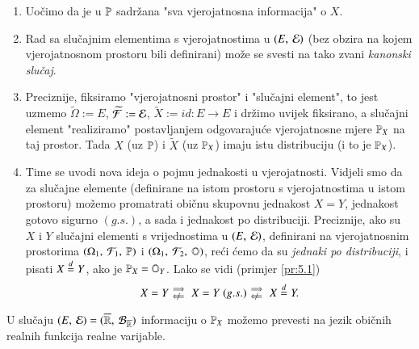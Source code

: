 \begin{nap} \label{nap:5.3}
    \quad
    \begin{enumerate}[label=(\alph*)]
        \item Uo\v cimo da je u $\mathbb{P}$ sadr\v zana "sva vjerojatnosna informacija" o $X$.
        \item Rad sa slu\v cajnim elementima s vjerojatnostima u $({E}, \: {\mathcal{E}})$ (bez obzira na kojem vjerojatnosnom prostoru bili definirani) mo\v ze se svesti na tako zvani \emph{kanonski slu\v caj}.
        \item Preciznije, fiksiramo "vjerojatnosni prostor" i "slu\v cajni element", to jest uzmemo $\widetilde{\Omega} := E$, $\widetilde{\mathcal{F}} := \mathcal{E}$, $\widetilde{X} := id : E \to E$ i dr\v zimo uvijek fiksirano, a slu\v cajni element "realiziramo" postavljanjem odgovaraju\' ce vjerojatnosne mjere $\mathbb{P}_X$ na taj prostor.
        Tada $X$ (uz $\mathbb{P}$) i $\widetilde{X}$ (uz $\mathbb{P}_X$) imaju istu distribuciju (i to je $\mathbb{P}_X$).
        \item Time se uvodi nova ideja o pojmu jednakosti u vjerojatnosti.
        Vidjeli smo da za slu\v cajne elemente (definirane na istom prostoru s vjerojatnostima u istom prostoru) mo\v zemo promatrati obi\v cnu skupovnu jednakost $X = Y$, jednakost gotovo sigurno $(g.s.)$, a sada i jednakost po distribuciji.
        Preciznije, ako su $X$ i $Y$ slu\v cajni elementi s vrijednostima u $({E}, \: {\mathcal{E}})$, definirani na vjerojatnosnim prostorima $(\Omega_1, \: \mathcal{F}_1, \: \mathbb{P})$ i $(\Omega_1, \: \mathcal{F}_2, \: \mathbb{O})$, re\' ci \' cemo da su \emph{jednaki po distribuciji}, i pisati $X \overset{d}{=} Y$, ako je $\mathbb{P}_X = \mathbb{O}_Y$.
        Lako se vidi (primjer \ref{pr:5.1})
        \begin{equation*}
            X = Y
            \begin{smallmatrix}
                \implies&  \\
                \notimpliedby&
            \end{smallmatrix}
            X = Y \; (g.s.)
            \begin{smallmatrix}
                \implies&  \\
                \notimpliedby&
            \end{smallmatrix}
            X \distJed Y.
        \end{equation*}
    \end{enumerate}
\end{nap}

U slu\v caju $({E}, \: {\mathcal{E}}) = ({\overline{\mathbb{R}}}, \: {\mathcal{B}_{\overline{\mathbb{R}}}})$ informaciju o $\mathbb{P}_X$ mo\v zemo prevesti na jezik obi\v cnih realnih funkcija realne varijable.

